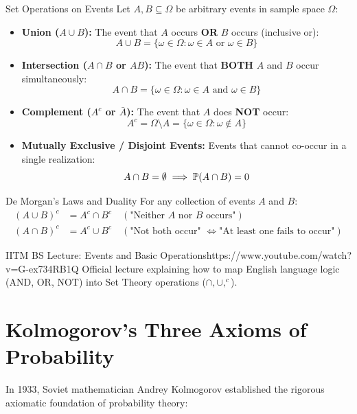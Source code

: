\begin{definitionbox}{Set Operations on Events}
Let $A, B \subseteq \Omega$ be arbitrary events in sample space $\Omega$:
\begin{itemize}
    \item \textbf{Union ($A \cup B$):} The event that $A$ occurs \textbf{OR} $B$ occurs (inclusive or):
    $$A \cup B = \{\omega \in \Omega \colon \omega \in A \text{ or } \omega \in B\}$$
    \item \textbf{Intersection ($A \cap B$ or $AB$):} The event that \textbf{BOTH} $A$ and $B$ occur simultaneously:
    $$A \cap B = \{\omega \in \Omega \colon \omega \in A \text{ and } \omega \in B\}$$
    \item \textbf{Complement ($A^c$ or $\bar{A}$):} The event that $A$ does \textbf{NOT} occur:
    $$A^c = \Omega \setminus A = \{\omega \in \Omega \colon \omega \notin A\}$$
    \item \textbf{Mutually Exclusive / Disjoint Events:} Events that cannot co-occur in a single realization:
    $$A \cap B = \emptyset \implies \P(A \cap B) = 0$$
\end{itemize}
\end{definitionbox}

\begin{theorembox}{De Morgan's Laws and Duality}
For any collection of events $A$ and $B$:
\begin{align*}
    (A \cup B)^c &= A^c \cap B^c \quad (\text{"Neither } A \text{ nor } B \text{ occurs"}) \\
    (A \cap B)^c &= A^c \cup B^c \quad (\text{"Not both occur" } \iff \text{"At least one fails to occur"})
\end{align*}
\end{theorembox}

\begin{videocard}{IITM BS Lecture: Events and Basic Operations}{https://www.youtube.com/watch?v=G-ex734RB1Q}
Official lecture explaining how to map English language logic (AND, OR, NOT) into Set Theory operations ($\cap, \cup, ^c$).
\end{videocard}

\section{Kolmogorov's Three Axioms of Probability}

In 1933, Soviet mathematician Andrey Kolmogorov established the rigorous axiomatic foundation of probability theory:

